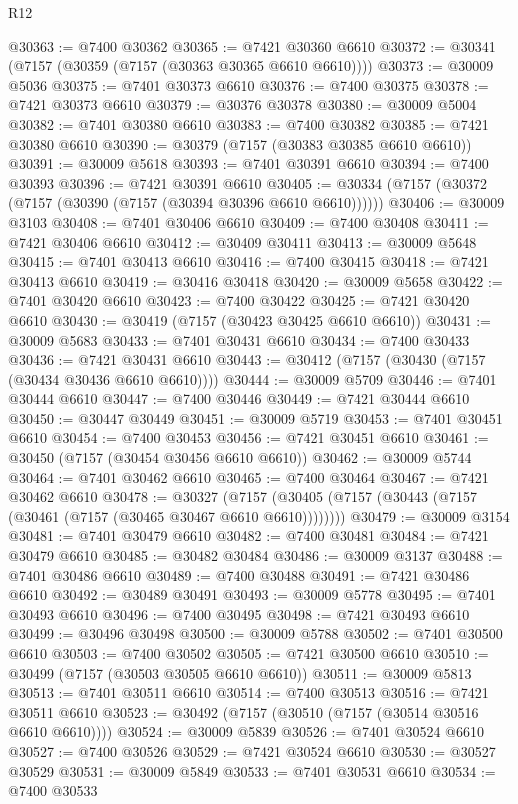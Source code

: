 \begin{lexlean}{R12}
\begin{coremodule}
@30363 := @7400 @30362
@30365 := @7421 @30360 @6610
@30372 := @30341 (@7157 (@30359 (@7157 (@30363 @30365 @6610 @6610))))
@30373 := @30009 @5036
@30375 := @7401 @30373 @6610
@30376 := @7400 @30375
@30378 := @7421 @30373 @6610
@30379 := @30376 @30378
@30380 := @30009 @5004
@30382 := @7401 @30380 @6610
@30383 := @7400 @30382
@30385 := @7421 @30380 @6610
@30390 := @30379 (@7157 (@30383 @30385 @6610 @6610))
@30391 := @30009 @5618
@30393 := @7401 @30391 @6610
@30394 := @7400 @30393
@30396 := @7421 @30391 @6610
@30405 := @30334 (@7157 (@30372 (@7157 (@30390 (@7157 (@30394 @30396 @6610 @6610))))))
@30406 := @30009 @3103
@30408 := @7401 @30406 @6610
@30409 := @7400 @30408
@30411 := @7421 @30406 @6610
@30412 := @30409 @30411
@30413 := @30009 @5648
@30415 := @7401 @30413 @6610
@30416 := @7400 @30415
@30418 := @7421 @30413 @6610
@30419 := @30416 @30418
@30420 := @30009 @5658
@30422 := @7401 @30420 @6610
@30423 := @7400 @30422
@30425 := @7421 @30420 @6610
@30430 := @30419 (@7157 (@30423 @30425 @6610 @6610))
@30431 := @30009 @5683
@30433 := @7401 @30431 @6610
@30434 := @7400 @30433
@30436 := @7421 @30431 @6610
@30443 := @30412 (@7157 (@30430 (@7157 (@30434 @30436 @6610 @6610))))
@30444 := @30009 @5709
@30446 := @7401 @30444 @6610
@30447 := @7400 @30446
@30449 := @7421 @30444 @6610
@30450 := @30447 @30449
@30451 := @30009 @5719
@30453 := @7401 @30451 @6610
@30454 := @7400 @30453
@30456 := @7421 @30451 @6610
@30461 := @30450 (@7157 (@30454 @30456 @6610 @6610))
@30462 := @30009 @5744
@30464 := @7401 @30462 @6610
@30465 := @7400 @30464
@30467 := @7421 @30462 @6610
@30478 := @30327
    (@7157 (@30405 (@7157 (@30443 (@7157 (@30461 (@7157 (@30465 @30467 @6610 @6610))))))))
@30479 := @30009 @3154
@30481 := @7401 @30479 @6610
@30482 := @7400 @30481
@30484 := @7421 @30479 @6610
@30485 := @30482 @30484
@30486 := @30009 @3137
@30488 := @7401 @30486 @6610
@30489 := @7400 @30488
@30491 := @7421 @30486 @6610
@30492 := @30489 @30491
@30493 := @30009 @5778
@30495 := @7401 @30493 @6610
@30496 := @7400 @30495
@30498 := @7421 @30493 @6610
@30499 := @30496 @30498
@30500 := @30009 @5788
@30502 := @7401 @30500 @6610
@30503 := @7400 @30502
@30505 := @7421 @30500 @6610
@30510 := @30499 (@7157 (@30503 @30505 @6610 @6610))
@30511 := @30009 @5813
@30513 := @7401 @30511 @6610
@30514 := @7400 @30513
@30516 := @7421 @30511 @6610
@30523 := @30492 (@7157 (@30510 (@7157 (@30514 @30516 @6610 @6610))))
@30524 := @30009 @5839
@30526 := @7401 @30524 @6610
@30527 := @7400 @30526
@30529 := @7421 @30524 @6610
@30530 := @30527 @30529
@30531 := @30009 @5849
@30533 := @7401 @30531 @6610
@30534 := @7400 @30533

\end{coremodule}
\end{lexlean}
